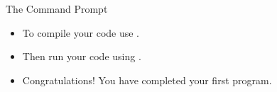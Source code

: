 \begin{frame}[fragile]{The Command Prompt}
\begin{itemize}
\item To compile your code use .
\begin{semiverbatim}\end{semiverbatim} \pause
\item Then run your code using .
\begin{semiverbatim}\end{semiverbatim}
\item Congratulations! You have completed your first program.
\end{itemize}
\end{frame}

